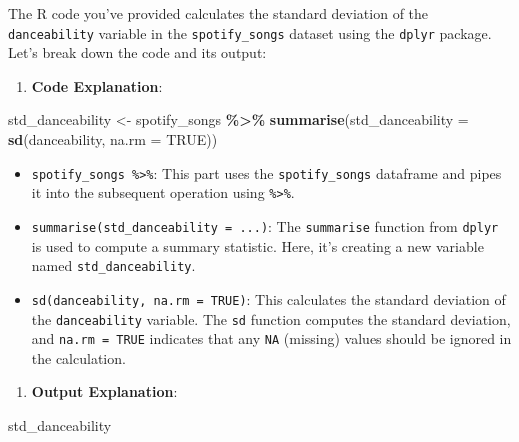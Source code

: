 \documentclass[
]{book}
\newenvironment{Shaded}{\begin{snugshade}}{\end{snugshade}}
\newcommand{\AttributeTok}[1]{\textcolor[rgb]{0.13,0.29,0.53}{#1}}
\newcommand{\ConstantTok}[1]{\textcolor[rgb]{0.56,0.35,0.01}{#1}}
\newcommand{\FunctionTok}[1]{\textcolor[rgb]{0.13,0.29,0.53}{\textbf{#1}}}
\newcommand{\NormalTok}[1]{#1}
\newcommand{\OtherTok}[1]{\textcolor[rgb]{0.56,0.35,0.01}{#1}}
\newcommand{\SpecialCharTok}[1]{\textcolor[rgb]{0.81,0.36,0.00}{\textbf{#1}}}
\providecommand{\tightlist}{%
  \setlength{\itemsep}{0pt}\setlength{\parskip}{0pt}}
\begin{document}
The R code you've provided calculates the standard deviation of the \texttt{danceability} variable in the \texttt{spotify\_songs} dataset using the \texttt{dplyr} package. Let's break down the code and its output:

\begin{enumerate}
\def\labelenumi{\arabic{enumi}.}
\tightlist
\item
  \textbf{Code Explanation}:
\end{enumerate}

\begin{Shaded}
\begin{Highlighting}[]
\NormalTok{std\_danceability }\OtherTok{\textless{}{-}}\NormalTok{ spotify\_songs }\SpecialCharTok{\%\textgreater{}\%}
  \FunctionTok{summarise}\NormalTok{(}\AttributeTok{std\_danceability =} \FunctionTok{sd}\NormalTok{(danceability, }\AttributeTok{na.rm =} \ConstantTok{TRUE}\NormalTok{))}
\end{Highlighting}
\end{Shaded}

\begin{itemize}
\tightlist
\item
  \texttt{spotify\_songs\ \%\textgreater{}\%}: This part uses the \texttt{spotify\_songs} dataframe and pipes it into the subsequent operation using \texttt{\%\textgreater{}\%}.
\item
  \texttt{summarise(std\_danceability\ =\ ...)}: The \texttt{summarise} function from \texttt{dplyr} is used to compute a summary statistic. Here, it's creating a new variable named \texttt{std\_danceability}.
\item
  \texttt{sd(danceability,\ na.rm\ =\ TRUE)}: This calculates the standard deviation of the \texttt{danceability} variable. The \texttt{sd} function computes the standard deviation, and \texttt{na.rm\ =\ TRUE} indicates that any \texttt{NA} (missing) values should be ignored in the calculation.
\end{itemize}

\begin{enumerate}
\def\labelenumi{\arabic{enumi}.}
\setcounter{enumi}{1}
\tightlist
\item
  \textbf{Output Explanation}:
\end{enumerate}

\begin{Shaded}
\begin{Highlighting}[]
\NormalTok{std\_danceability}
\end{Highlighting}
\end{Shaded}
\end{document}

